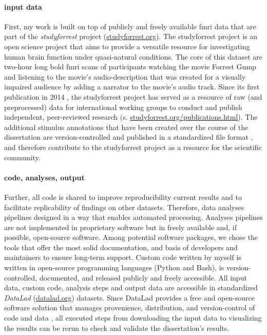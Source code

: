 \paragraph{input data}

First, my work is built on top of publicly and freely available \ac{fmri} data
that are part of the \textit{studyforrest} project
(\href{www.studyforrest.org}{\url{studyforrest.org}}).
%
The studyforrest project is an open science project that aims to provide a
versatile resource for investigating human brain function under quasi-natural
conditions.
%
The core of this dataset are two-hour long \ac{bold} \ac{fmri} scans of
participants watching the movie Forrest Gump \citep{ForrestGumpMovie} and
listening to the movie's audio-description that was created for a visually
impaired audience by adding a narrator to the movie's audio track.
%
Since its first publication in 2014 \citep{hanke2014audiomovie}, the
studyforrest project has served as a resource of raw (and preprocessed) data for
international working groups to conduct and publish independent, peer-reviewed
research (s.
\href{www.studyforrest.org/publications.html}{\url{studyforrest.org/publications.html}}).
%
The additional stimulus annotations that have been created over the course of
the dissertation are version-controlled and published in a standardized file
format \citep{haeusler2021speechanno}, and therefore contribute to the
studyforrest project as a resource for the scientific community.


\paragraph{code, analyses, output}

Further, all code is shared to improve reproducibility current results and to
facilitate replicability of findings on other datasets.
Therefore, data analyses pipelines designed in a way that enables automated
processing.
%
Analyses pipelines are not implemented in proprietary software but in freely
available and, if possible, open-source software.
Among potential software packages, we chose the tools that offer the most solid
documentation, and basis of developers and maintainers to ensure long-term
support.
Custom code written by myself is written in open-source programming languages
(Python and Bash), is version-controlled, documented, and released publicly and
freely accessible.
%
All input data, custom code, analysis steps and output data are accessible in
standardized \textit{DataLad} (\href{www.datalad.org}{datalad.org}) datasets.
Since DataLad provides a free and open-source software solution that manages
provenience, distribution, and version-control of code and data
\citep{halchenko2021datalad}, all executed steps from downloading the input data
to visualizing the results can be rerun to check and validate the dissertation's
results.


